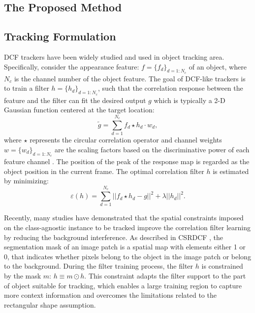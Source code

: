 \documentclass[review]{elsarticle}
\begin{document}
\begin{CJK*}{UTF8}{gbsn}
\section{The Proposed Method}

\subsection{Tracking Formulation} \label{sec:InstMask}
DCF trackers \cite{Bolme2010VisualOT, Danelljan2014AccurateSE, Henriques2015HighSpeedTW, Li2014ASA} have been widely studied and used in object tracking area. Specifically, consider the appearance feature: $f=\{f_d\}_{d=1:N_c}$ of an object, where $N_c$ is the channel number of the object feature. The goal of DCF-like trackers is to train a filter $h=\{h_d\}_{d=1:N_c}$, such that the correlation response between the feature and the filter can fit the desired output $g$ which is typically a 2-D Gaussian function centered at the target location: 
\begin{equation} \label{eq:dcf}
\tilde{g}=\sum_{d=1}^{N_c}f_d \star h_d \cdot w_d,
\end{equation}
where $\star$ represents the circular correlation operator and channel weights $w = \{w_d\}_{d=1:N_c}$ are the scaling factors based on the discriminative power of each feature channel \cite{Lukezic2017DiscriminativeCF}.
The position of the peak of the response map is regarded as the object position in the current frame.
The optimal correlation filter $h$ is estimated by minimizing:
\begin{equation}
\varepsilon(h) = \sum_{d=1}^{N_c}||f_d \star h_d - g||^2+\lambda||h_d||^2.
\end{equation}

Recently, many studies \cite{Danelljan2015LearningSR, Lukezic2017DiscriminativeCF, Galoogahi2017LearningBC, Xu2018LearningAD, Feng2018LearningSR} have demonstrated that the spatial constraints imposed on the class-agnostic instance to be tracked improve the correlation filter learning by reducing the background interference. As described in CSRDCF \cite{Lukezic2017DiscriminativeCF}, the segmentation mask of an image patch is a spatial map with elements either 1 or 0, that indicates whether pixels belong to the object in the image patch or belong to the background. During the filter training process, the filter $h$ is constrained by the mask $m$: $h \equiv m \odot h$. This constraint adapts the filter support to the part of object suitable for tracking, which enables a large training region to capture more context information and overcomes the limitations related to the rectangular shape assumption.


\end{CJK*}
\end{document}
